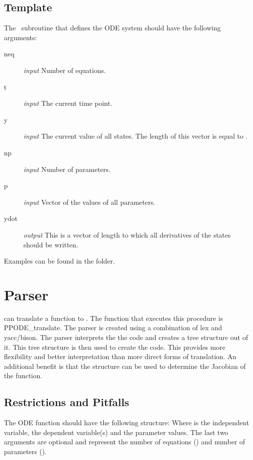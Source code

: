 \subsection{Template}
The \Fortran~subroutine that defines the ODE system should have the following arguments:
\begin{description}
 \item[neq] \emph{input} Number of equations.
 \item[t] \emph{input} The current time point.
 \item[y] \emph{input} The current value of all states. The length of this vector is equal to .
 \item[np] \emph{input} Number of parameters.
 \item[p] \emph{input} Vector of the values of all parameters.
 \item[ydot] \emph{output} This is a vector of length  to which all derivatives of the states should be written.
\end{description}



Examples can be found in the  folder.

\section{Parser} \label{sec:Parser}
\PPODESUITE can translate a \MATLAB function to \Fortran. The function that executes this procedure is PPODE\_translate. The parser is created using a combination of lex and yacc/bison. The parser interprets the the \MATLAB code and creates a tree structure out of it. This tree structure is then used to create the \Fortran code. This provides more flexibility and better interpretation than more direct forms of translation. An additional benefit is that the structure can be used to determine the Jacobian of the function.

\subsection{Restrictions and Pitfalls}
The \MATLAB ODE function should have the following structure:
Where  is the independent variable,  the dependent variable(s) and  the parameter values. The last two arguments are optional and represent the number of equations () and number of parameters ().

